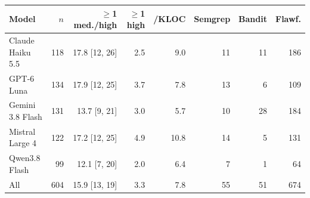 \begin{tabular}{@{}lrrrrrrr@{}}
\toprule
Model & $n$ & $\geq$1 med./high & $\geq$1 high & /KLOC & Semgrep & Bandit & Flawf. \\
\midrule
Claude Haiku 5.5 & 118 & 17.8 [12, 26] & 2.5 & 9.0 & 11 & 11 & 186 \\
GPT-6 Luna & 134 & 17.9 [12, 25] & 3.7 & 7.8 & 13 & 6 & 109 \\
Gemini 3.8 Flash & 131 & 13.7 [9, 21] & 3.0 & 5.7 & 10 & 28 & 184 \\
Mistral Large 4 & 122 & 17.2 [12, 25] & 4.9 & 10.8 & 14 & 5 & 131 \\
Qwen3.8 Flash & 99 & 12.1 [7, 20] & 2.0 & 6.4 & 7 & 1 & 64 \\
\midrule
All & 604 & 15.9 [13, 19] & 3.3 & 7.8 & 55 & 51 & 674 \\
\bottomrule
\end{tabular}
